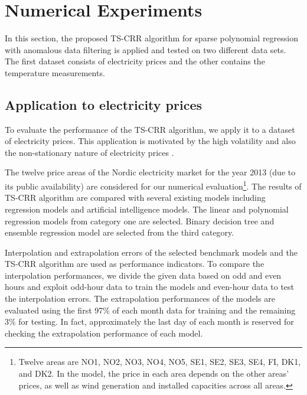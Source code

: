 \documentclass[smallextended,referee,envcountsect,,numbers]{svjour3}
\begin{document}
\section{Numerical Experiments} \label{sec:app}
In this section, the proposed TS-CRR algorithm for sparse polynomial regression with anomalous data filtering is applied and tested on two different data sets. The first dataset consists of electricity prices and the other contains the temperature measurements. 

\subsection{Application to electricity prices}
\noindent To evaluate the performance of the TS-CRR algorithm, we apply it to a dataset of electricity prices. This application is motivated by the high volatility and also the non-stationary nature of electricity prices \cite{bunn2004modelling}. 

The twelve price areas of the Nordic electricity market for the year 2013 (due to its public availability) are considered for our numerical evaluation\footnote{Twelve areas are NO1, NO2, NO3, NO4, NO5, SE1, SE2, SE3, SE4, FI, DK1, and DK2. In the model, the price in each area depends on the other areas’ prices, as well as wind generation and installed capacities across all areas.}. The results of TS-CRR algorithm are compared with several existing models including regression models and artificial intelligence models. The linear and polynomial regression models from category one are selected. Binary decision tree and ensemble regression model are selected from the third category.

Interpolation and extrapolation errors of the selected benchmark models and the TS-CRR algorithm are used as performance indicators. To compare the interpolation performances, we divide the given data based on odd and even hours and exploit odd-hour data to train the models and even-hour data to test the interpolation errors. The extrapolation performances of the models are evaluated using the first 97\% of each month data for training and the remaining 3\% for testing. In fact, approximately the last day of each month is reserved for checking the extrapolation performance of each model.
\end{document}
